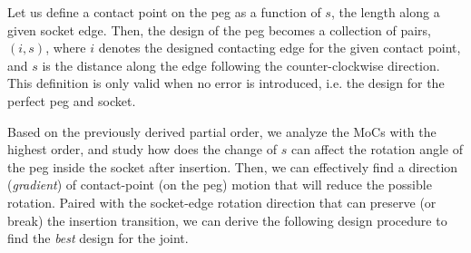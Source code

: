 \documentclass[11pt, twocolumn]{article}
\begin{document}

Let us define a contact point on the peg as a function of $s$, the length along a given socket edge. Then, the design of the peg becomes a collection of pairs, $(i, s)$, where $i$ denotes the designed contacting edge for the given contact point, and $s$ is the distance along the edge following the counter-clockwise direction. This definition is only valid when no error is introduced, i.e. the design for the perfect peg and socket. 

Based on the previously derived partial order, we analyze the MoCs with the highest order, and study how does the change of $s$ can affect the rotation angle of the peg inside the socket after insertion. Then, we can effectively find a direction ({\em gradient}) of contact-point (on the peg) motion that will reduce the possible rotation. Paired with the socket-edge rotation direction that can preserve (or break) the insertion transition, we can derive the following design procedure to find the {\em best} design for the joint. 

\end{document}
